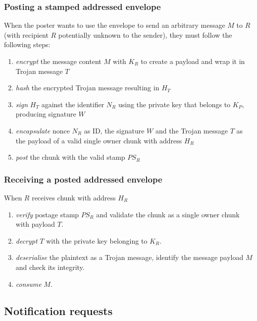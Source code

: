 \subsubsection{Posting a stamped addressed envelope}

When the poster wants to use the envelope to send an arbitrary message $M$ to $R$ (with recipient $R$ potentially unknown to the sender), they must follow the following steps:

\begin{enumerate}[noitemsep]
\item \emph{encrypt} the message content $M$ with $K_R$ to create a payload and wrap it in Trojan message $T$
\item \emph{hash} the encrypted Trojan message resulting in $H_T$
\item \emph{sign} $H_T$ against the identifier $N_R$ using the private key that belongs to $K_P$, producing signature $W$
\item \emph{encapsulate} nonce $N_R$ as ID, the signature $W$ and the Trojan message $T$ as the payload of a valid single owner chunk with address $H_R$
\item \emph{post} the chunk with the valid stamp $PS_R$
\end{enumerate}

\subsubsection{Receiving a posted addressed envelope}

When $R$ receives chunk with address $H_R$

\begin{enumerate}[noitemsep]
\item \emph{verify} postage stamp $PS_R$ and validate the chunk as a single owner chunk with payload $T$.
\item \emph{decrypt} $T$ with the private key belonging to $K_R$.
\item \emph{deserialise} the plaintext as a Trojan message, identify the message payload $M$ and check its integrity.
\item \emph{consume} $M$.
\end{enumerate}

\subsection{Notification requests\statusgreen}\label{sec:notification-requests} 

